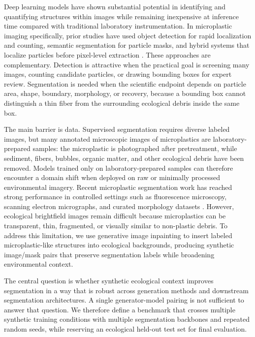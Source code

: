 \documentclass{article}
\begin{document}
Deep learning models have shown substantial potential in identifying and quantifying structures within images while remaining inexpensive at inference time compared with traditional laboratory instrumentation. In microplastic imaging specifically, prior studies have used object detection for rapid localization and counting, semantic segmentation for particle masks, and hybrid systems that localize particles before pixel-level extraction \cite{lorenzo2021,park2022mpnet,shi2022sem,hao2024}. These approaches are complementary. Detection is attractive when the practical goal is screening many images, counting candidate particles, or drawing bounding boxes for expert review. Segmentation is needed when the scientific endpoint depends on particle area, shape, boundary, morphology, or recovery, because a bounding box cannot distinguish a thin fiber from the surrounding ecological debris inside the same box.

The main barrier is data. Supervised segmentation requires diverse labeled images, but many annotated microscopic images of microplastics are laboratory-prepared samples: the microplastic is photographed after pretreatment, while sediment, fibers, bubbles, organic matter, and other ecological debris have been removed. Models trained only on laboratory-prepared samples can therefore encounter a domain shift when deployed on raw or minimally processed environmental imagery. Recent microplastic segmentation work has reached strong performance in controlled settings such as fluorescence microscopy, scanning electron micrographs, and curated morphology datasets \cite{park2022mpnet,shi2022sem,yao2025}. However, ecological brightfield images remain difficult because microplastics can be transparent, thin, fragmented, or visually similar to non-plastic debris. To address this limitation, we use generative image inpainting to insert labeled microplastic-like structures into ecological backgrounds, producing synthetic image/mask pairs that preserve segmentation labels while broadening environmental context.

The central question is whether synthetic ecological context improves segmentation in a way that is robust across generation methods and downstream segmentation architectures. A single generator-model pairing is not sufficient to answer that question. We therefore define a benchmark that crosses multiple synthetic training conditions with multiple segmentation backbones and repeated random seeds, while reserving an ecological held-out test set for final evaluation.
\end{document}
